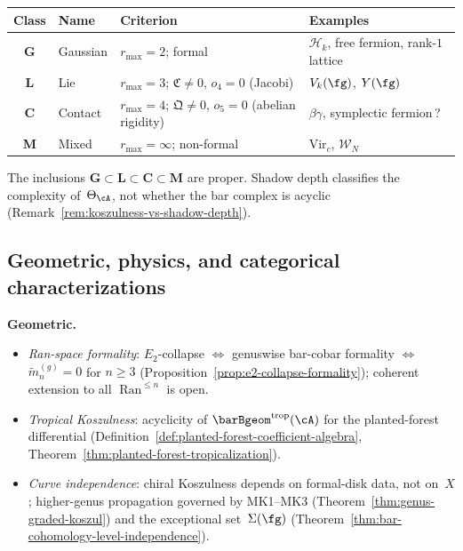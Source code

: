 \begin{center}
\renewcommand{\arraystretch}{1.15}
\begin{tabular}{@{}clll@{}}
\toprule
\textbf{Class} & \textbf{Name} & \textbf{Criterion}
  & \textbf{Examples} \\
\midrule
\textbf{G} & Gaussian
  & $r_{\max}=2$; formal
  & $\mathcal{H}_k$, free fermion, rank-$1$ lattice \\
\textbf{L} & Lie
  & $r_{\max}=3$; $\mathfrak{C}\neq 0$, $o_4=0$ (Jacobi)
  & $V_k(\fg)$, $Y(\fg)$ \\
\textbf{C} & Contact
  & $r_{\max}=4$; $\mathfrak{Q}\neq 0$, $o_5=0$ (abelian rigidity)
  & $\beta\gamma$, symplectic fermion\,? \\
\textbf{M} & Mixed
  & $r_{\max}=\infty$; non-formal
  & $\mathrm{Vir}_c$, $\mathcal{W}_N$ \\
\bottomrule
\end{tabular}
\end{center}

\noindent
The inclusions $\mathbf{G} \subset \mathbf{L} \subset
\mathbf{C} \subset \mathbf{M}$ are proper.  Shadow depth
classifies the complexity of~$\Theta_\cA$, not whether the
bar complex is acyclic
(Remark~\ref{rem:koszulness-vs-shadow-depth}).


\subsection{Geometric, physics, and categorical
  characterizations}
\label{subsec:concordance-further-characterizations}

\noindent\textbf{Geometric.}
\begin{itemize}[nosep]
\item \emph{Ran-space formality}: $E_2$-collapse $\Leftrightarrow$ genuswise bar-cobar formality $\Leftrightarrow$ $\tilde{m}_n^{(g)} = 0$ for $n \ge 3$ (Proposition~\ref{prop:e2-collapse-formality}); coherent extension to all $\operatorname{Ran}^{\le n}$ is open.
\item \emph{Tropical Koszulness}: acyclicity of $\barBgeom^{\mathrm{trop}}(\cA)$ for the planted-forest differential (Definition~\ref{def:planted-forest-coefficient-algebra}, Theorem~\ref{thm:planted-forest-tropicalization}).
\item \emph{Curve independence}: chiral Koszulness depends on formal-disk data, not on~$X$; higher-genus propagation governed by MK1--MK3 (Theorem~\ref{thm:genus-graded-koszul}) and the exceptional set~$\Sigma(\fg)$ (Theorem~\ref{thm:bar-cohomology-level-independence}).
\end{itemize}


